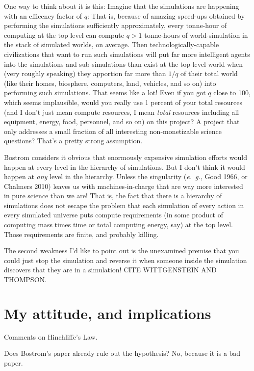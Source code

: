 \documentclass[12pt,letterpaper]{article}
\newcommand{\foreign}[1]{\textsl{#1}}
\newcommand{\eg}{\foreign{e.~g.}}
\begin{document}
One way to think about it is this: Imagine that the simulations are
happening with an efficency factor of $q$: That is, because of amazing
speed-ups obtained by performing the simulations sufficiently
approximately, every tonne-hour of computing at the top level can
compute $q>1$ tonne-hours of world-simulation in the stack of
simulated worlds, on average. Then technologically-capable
civilizations that want to run such simulations will put far more
intelligent agents into the simulations and sub-simulations than exist
at the top-level world when (very roughly speaking) they apportion far
more than $1/q$ of their total world (like their homes, biosphere,
computers, land, vehicles, and so on) into performing such
simulations. That seems like a lot! Even if you got $q$ close to 100,
which seems implausible, would you really use 1 percent of your total
resources (and I don't just mean compute resources, I mean
\emph{total} resources including all equipment, energy, food,
personnel, and so on) on this project? A project that only addresses a
small fraction of all interesting non-monetizable science questions?
That's a pretty strong assumption.

Bostrom considers it obvious that enormously expensive simulation
efforts would happen at every level in the hierarchy of
simulations. But I don't think it would happen at \emph{any} level in
the hierarchy. Unless the singularity (\eg, Good 1966, or Chalmers 2010) leaves us with
machines-in-charge that are way more interested in pure science than
we are! That is, the fact that there is a hierarchy of simulations
does not escape the problem that each simulation of every action in
every simulated universe puts compute requirements (in some product of
computing mass times time or total computing energy, say) at the top
level. Those requirements are finite, and probably killing.

The second weakness I'd like to point out is the unexamined premise
that you could just stop the simulation and reverse it when someone
inside the simulation discovers that they are in a simulation! CITE
WITTGENSTEIN AND THOMPSON.

\section{My attitude, and implications}

Comments on Hinchliffe's Law.

Does Bostrom's paper already rule out the hypothesis? No, because it
is a bad paper.
\end{document}
